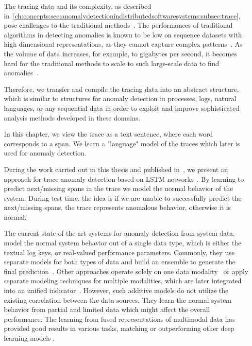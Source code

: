 The tracing data and its complexity, as described in~\autoref{ch:concepts:sec:anomalydetectionindistributedsoftwaresystems:subsec:trace}, pose challenges to the traditional methods~\cite{chow2014mystery}.
The performances of traditional algorithms in detecting anomalies is known to be low on sequence datasets with high dimensional representations, as they cannot capture complex patterns~\cite{pang2020deep}. As the volume of data increases, for example, to gigabytes per second, it becomes hard for the traditional methods to scale to such large-scale data to find anomalies~\cite{chalapathy2019deep}.

Therefore, we transfer and compile the tracing data into an abstract structure, which is similar to structures for anomaly detection in processes, logs, natural languages, or any sequential data in order to exploit and improve sophisticated analysis methods developed in these domains. 

In this chapter, we view the trace as a text sentence, where each word corresponds to a span. We learn a "language" model of the traces which later is used for anomaly detection.

During the work carried out in this thesis and published in~\cite{nedelkoski2019anomaly,nedelkoski2019anomalymultimodal}, we present an approach for trace anomaly detection based on LSTM networks~\cite{hochreiter1997long}. By learning to predict next/missing spans in the trace we model the normal behavior of the system. During test time, the idea is if we are unable to successfully predict the next/missing spans, the trace represents anomalous behavior, otherwise it is normal.

The current state-of-the-art systems for anomaly detection from system data, model the normal system behavior out of a single data type, which is either the textual log keys, or real-valued performance parameters. Commonly, they use separate models for both types of data and build an ensemble to generate the final prediction~\cite{du2017deeplog}. Other approaches operate solely on one data modality~\cite{8456348, 8457902} or apply separate modeling techniques for multiple modalities, which are later integrated into an unified indicator~\cite{fu2009execution}. However, such additive models do not utilize the existing correlation between the data sources. They learn the normal system behavior from partial and limited data which might affect the overall performance. The learning from fused representations of multimodal data has provided good results in various tasks, matching or outperforming other deep learning models \cite{srivastava2012multimodal}.

